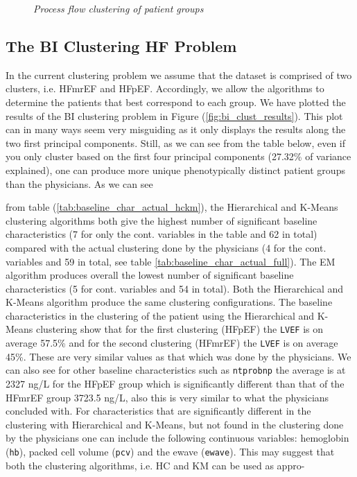 \documentclass[../thesis.tex]{subfiles}
\begin{document}
\begin{figure}
    \centering
    
    \caption[Process flow clustering of patient groups]{\textit{Process flow clustering of patient groups}}
    \label{fig:process_flow_clustering}
\end{figure}

\vspace*{-0,5cm}\subsection{The BI Clustering HF Problem}
\label{subsec:bi_clust}

In the current clustering problem we assume that the dataset is comprised of two clusters, i.e. HFmrEF and HFpEF. Accordingly, we allow the algorithms to determine the patients that best correspond to each group. We have plotted the results of the BI clustering problem in Figure (\ref{fig:bi_clust_results}). This plot can in many ways seem very misguiding as it only displays the results along the two first principal components. Still, as we can see from the table below, even if you only cluster based on the first four principal components (27.32\% of variance explained), one can produce more unique phenotypically distinct patient groups than the physicians. As we can see   





\noindent from table (\ref{tab:baseline_char_actual_hckm}), the  Hierarchical and K-Means clustering algorithms both give the highest number of significant baseline characteristics (7 for only the cont. variables in the table and 62 in total) compared with the actual clustering done by the physicians (4 for the cont. variables and 59 in total, see table \ref{tab:baseline_char_actual_full}). The EM algorithm produces overall the lowest number of significant baseline characteristics (5 for cont. variables and 54 in total). Both the Hierarchical and K-Means algorithm produce the same clustering configurations. The baseline characteristics in the clustering of the patient using the Hierarchical and K-Means clustering show that for the first clustering (HFpEF) the \texttt{LVEF} is on average 57.5\% and for the second clustering (HFmrEF) the \texttt{LVEF} is on average 45\%. These are very similar values as that which was done by the physicians. We can also see for other baseline characteristics such as \texttt{ntprobnp} the average is at 2327 ng/L for the HFpEF group which is significantly different than that of the HFmrEF group 3723.5 ng/L, also this is very similar to what the physicians concluded with. For characteristics that are significantly different in the clustering with Hierarchical and K-Means, but not found in the clustering done by the physicians one can include the following continuous variables: hemoglobin (\texttt{hb}), packed cell volume (\texttt{pcv}) and the ewave (\texttt{ewave}). This may suggest that both the clustering algorithms, i.e. HC and KM can be used as appro-   
\end{document}
